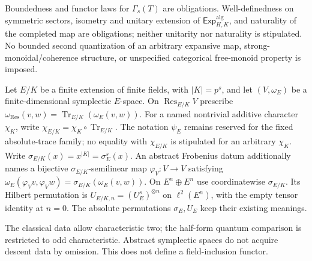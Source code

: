 \begin{scope}
Boundedness and functor laws for $\Gamma_s(T)$ are obligations. Well-definedness on symmetric sectors, isometry and unitary extension of $\mathsf{Exp}^{\mathrm{alg}}_{H,K}$, and naturality of the completed map are obligations; neither unitarity nor naturality is stipulated. No bounded second quantization of an arbitrary expansive map, strong-monoidal/coherence structure, or unspecified categorical free-monoid property is imposed.
\end{scope}

\begin{definition}
Let $E/K$ be a finite extension of finite fields, with $|K|=p^s$, and let
$(V,\omega_E)$ be a finite-dimensional symplectic $E$-space.
On $\operatorname{Res}_{E/K}V$ prescribe
$\omega_{\mathrm{Res}}(v,w)=\operatorname{Tr}_{E/K}(\omega_E(v,w))$.
For a named nontrivial additive character $\chi_K$, write
$\chi_{E/K}=\chi_K\circ\operatorname{Tr}_{E/K}$.
The notation $\psi_E$ remains reserved for the fixed absolute-trace family;
no equality with $\chi_{E/K}$ is stipulated for an arbitrary $\chi_K$.
Write $\sigma_{E/K}(x)=x^{|K|}=\sigma_E^s(x)$.
An abstract Frobenius datum additionally names a bijective
$\sigma_{E/K}$-semilinear map $\varphi_V:V\to V$ satisfying
$\omega_E(\varphi_Vv,\varphi_Vw)=\sigma_{E/K}(\omega_E(v,w))$.
On $E^n\oplus E^n$ use coordinatewise $\sigma_{E/K}$.
Its Hilbert permutation is
$U_{E/K,n}=(U_E^s)^{\otimes n}$ on $\ell^2(E^n)$, with the empty tensor
identity at $n=0$. The absolute permutations $\sigma_E,U_E$ keep their
existing meanings.
\end{definition}
\begin{scope}
The classical data allow characteristic two; the half-form quantum comparison is restricted to odd characteristic. Abstract symplectic spaces do not acquire descent data by omission. This does not define a field-inclusion functor.
\end{scope}

